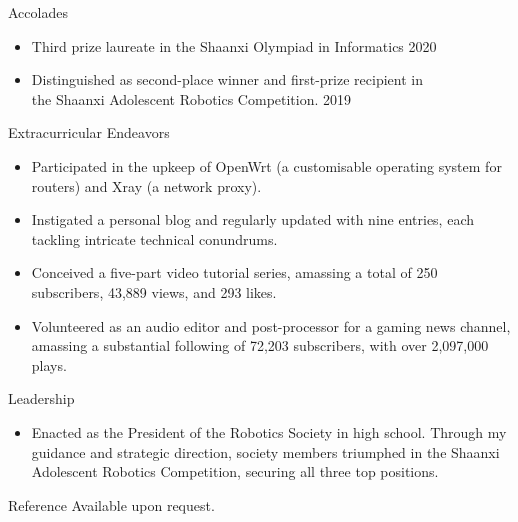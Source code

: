 \documentclass{resume} %
\begin{document}
\begin{rSection}{Accolades} 
\begin{itemize}
    \item Third prize laureate in the Shaanxi Olympiad in Informatics \hfill 2020
    \item Distinguished as second-place winner and first-prize recipient in \\
    the Shaanxi Adolescent Robotics Competition. \hfill 2019
\end{itemize}
\end{rSection}
\begin{rSection}{Extracurricular Endeavors} 
\begin{itemize}
    \item 	Participated in the upkeep of OpenWrt (a customisable operating system for routers) and Xray (a network proxy).
    \item	Instigated a personal blog and regularly updated with nine entries, each tackling intricate technical conundrums.
    \item   Conceived a five-part video tutorial series, amassing a total of 250 subscribers, 43,889 views, and 293 likes.
    \item   Volunteered as an audio editor and post-processor for a gaming news channel, amassing a substantial following of 72,203 subscribers, with over 2,097,000 plays.
\end{itemize}
\end{rSection}

\begin{rSection}{Leadership} 
\begin{itemize}
    \item Enacted as the President of the Robotics Society in high school. Through my guidance and strategic direction, society members triumphed in the Shaanxi Adolescent Robotics Competition, securing all three top positions.
\end{itemize}
\end{rSection}

\begin{rSection}{Reference} 
    Available upon request.
\end{rSection}
\end{document}
